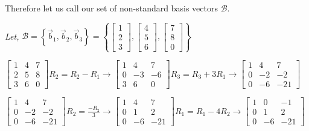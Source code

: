 \documentclass{article}
\begin{document}
{{	Therefore let us call our set of non-standard basis vectors $\mathcal{B}$.
}
\begin{center}
\textit{Let,}
$\mathcal{B} = \left\{\vec{b}_1,\vec{b}_2, \vec{b}_3\right\} = \left\{\begin{bmatrix} 
	1 \\
	2 \\
	3
\end{bmatrix},
\begin{bmatrix}
	4 \\
	5 \\
	6
\end{bmatrix},
\begin{bmatrix}
	7 \\
	8 \\
	0
\end{bmatrix} \right\}
$
\end{center}
\begin{center}
$\begin{bmatrix}
	1 & 4 & 7 \\
	2& 5 & 8 \\
	3 & 6 & 0
\end{bmatrix} R_{2} = R_{2} - R_{1} \rightarrow 
\begin{bmatrix}
	1 & 4 & 7 \\
	0 & -3 & -6 \\
	3 & 6& 0
\end{bmatrix} R_{3} = R_{3} + 3R_{1} \rightarrow 
\begin{bmatrix}
	1 & 4 & 7 \\
	0 & -2 & -2 \\
	0 & -6 & -21
\end{bmatrix}$ 
\end{center}

\begin{center}
	$
\begin{bmatrix}
	1 & 4 & 7 \\
	0 & -2 & -2 \\
	0 & -6 & -21
\end{bmatrix}  R_{2} = \frac{-R_2}{3}  \rightarrow 
\begin{bmatrix}
	1 & 4 & 7 \\
	0 & 1 & 2 \\
	0 & -6 & -21
\end{bmatrix}  R_{1} = R_{1} - 4R_{2}  \rightarrow
\begin{bmatrix}
	1 & 0 & -1 \\
	0 & 1 & 2 \\
	0 & -6 & -21
\end{bmatrix}$  


\end{center}}
\end{document}
